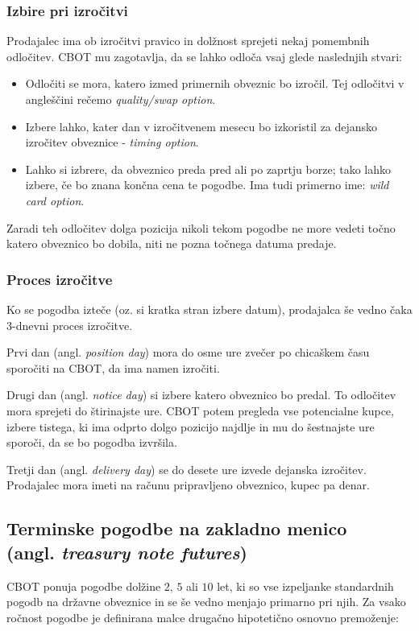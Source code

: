 \documentclass[a4paper, 11pt]{article}
\begin{document}
\subsubsection{Izbire pri izročitvi}
Prodajalec ima ob izročitvi pravico in dolžnost sprejeti nekaj pomembnih odločitev. CBOT mu 
zagotavlja, da se lahko odloča vsaj glede naslednjih stvari:

\begin{itemize}
    \item Odločiti se mora, katero izmed primernih obveznic bo izročil. Tej odločitvi v angleščini 
            rečemo \textit{quality/swap option}.
    \item Izbere lahko, kater dan v izročitvenem mesecu bo izkoristil za dejansko izročitev
            obveznice - \textit{timing option}.
    \item Lahko si izbrere, da obveznico preda pred ali po zaprtju borze; tako lahko izbere, če 
            bo znana končna cena te pogodbe. Ima tudi primerno ime: \textit{wild card option}. 
\end{itemize}

Zaradi teh odločitev dolga pozicija nikoli tekom pogodbe ne more vedeti točno katero obveznico bo
dobila, niti ne pozna točnega datuma predaje.

\subsubsection{Proces izročitve}
Ko se pogodba izteče (oz. si kratka stran izbere datum), prodajalca še vedno čaka 3-dnevni proces 
izročitve. 

Prvi dan (angl. \textit{position day}) mora do osme ure zvečer po chicaškem času sporočiti na 
CBOT, da ima namen izročiti. 

Drugi dan (angl. \textit{notice day}) si izbere katero obveznico bo predal. To odločitev mora 
sprejeti do štirinajste ure. CBOT potem pregleda vse potencialne kupce, izbere tistega, ki 
ima odprto dolgo pozicijo najdlje in mu do šestnajste ure sporoči, da se bo pogodba izvršila. 

Tretji dan (angl. \textit{delivery day}) se do desete ure izvede dejanska izročitev. Prodajalec 
mora imeti na računu pripravljeno obveznico, kupec pa denar. 


\subsection{Terminske pogodbe na zakladno menico \\ (angl. \textit{treasury note futures})}
CBOT ponuja pogodbe dolžine $2$, $5$ ali $10$ let, ki so vse izpeljanke standardnih pogodb na 
državne obveznice in se še vedno menjajo primarno pri njih. Za vsako ročnost pogodbe je 
definirana malce drugačno hipotetično osnovno premoženje:
\end{document}
